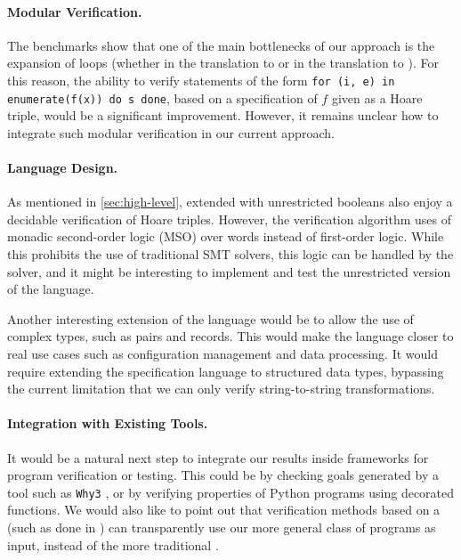 \paragraph{Modular Verification.} The benchmarks show that one of the main
bottlenecks of our approach is the expansion of loops (whether in the
translation to  or in the translation to
). For this reason, the ability to verify
statements of the form \texttt{for (i, e) in enumerate(f(x)) do s done}, based
on a specification of $f$ given as a Hoare triple, would be a significant
improvement. However, it remains unclear how to integrate such modular
verification in our current approach.

\paragraph{Language Design.} As mentioned in
\cref{sec:high-level}, 
extended with unrestricted booleans also enjoy a decidable verification of
Hoare triples. However, the verification algorithm uses of monadic second-order
logic (MSO) over words instead of first-order logic. While this prohibits the
use of traditional SMT solvers, this logic can be handled by the 
solver, and it might be interesting to implement and test the unrestricted
version of the language. 

Another interesting extension of the language would be to allow the use of
complex types, such as pairs and records. This would make the language closer
to real use cases such as configuration management and data processing. It
would require extending the specification language to structured data types,
bypassing the current limitation that we can only verify string-to-string
transformations.


\paragraph{Integration with Existing Tools.} It would be a natural next step to
integrate our results inside frameworks for program verification or testing.
This could be by checking goals generated by a tool such as \texttt{Why3}
\cite{Why3}, or by verifying properties of Python programs using decorated
functions. We would also like to point out that verification methods based on a
 (such as done in \cite{CHLRW19}) can
transparently use our more general class of programs as input, instead of the
more traditional . 
